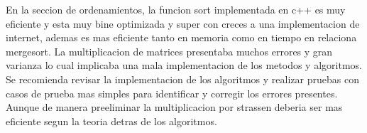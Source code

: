 En la seccion de ordenamientos, la funcion sort implementada en c++ es muy eficiente y esta muy bine optimizada y super con creces a una implementacion de internet, ademas es mas eficiente tanto en memoria como en tiempo en relaciona mergesort.
La multiplicacion de matrices presentaba muchos errores y gran varianza lo cual implicaba una mala implementacion de los metodos y algoritmos. Se recomienda revisar la implementacion de los algoritmos y realizar pruebas con casos de prueba mas simples para identificar y corregir los errores presentes. Aunque de manera preeliminar la multiplicacion por strassen deberia ser mas eficiente segun la teoria detras de los algoritmos.